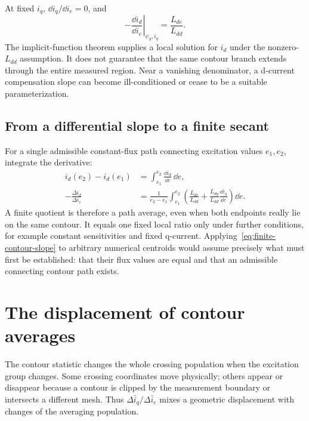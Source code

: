 At fixed $i_q$, $\dd i_q/\dd i_e=0$, and
\begin{equation}\label{eq:fixed-q-slope}
-\left.\frac{\dd i_d}{\dd i_e}\right|_{\psi_d,i_q}
=\frac{L_{de}}{L_{dd}}.
\end{equation}
The implicit-function theorem supplies a local solution for $i_d$ under the nonzero-$L_{dd}$ assumption. It does not guarantee that the same contour branch extends through the entire measured region. Near a vanishing denominator, a d-current compensation slope can become ill-conditioned or cease to be a suitable parameterization.

\subsection{From a differential slope to a finite secant}
For a single admissible constant-flux path connecting excitation values $e_1,e_2$, integrate the derivative:
\begin{align}
i_d(e_2)-i_d(e_1)
&=\int_{e_1}^{e_2}\frac{\dd i_d}{\dd e}\,\dd e,\\
-\frac{\Delta i_d}{\Delta i_e}
&=\frac{1}{e_2-e_1}\int_{e_1}^{e_2}
\left(\frac{L_{de}}{L_{dd}}
+\frac{L_{dq}}{L_{dd}}\frac{\dd i_q}{\dd e}\right)\dd e.
\label{eq:finite-contour-slope}
\end{align}
A finite quotient is therefore a path average, even when both endpoints really lie on the same contour. It equals one fixed local ratio only under further conditions, for example constant sensitivities and fixed q-current. Applying~\eqref{eq:finite-contour-slope} to arbitrary numerical centroids would assume precisely what must first be established: that their flux values are equal and that an admissible connecting contour path exists.

\section{The displacement of contour averages}
The contour statistic changes the whole crossing population when the excitation group changes. Some crossing coordinates move physically; others appear or disappear because a contour is clipped by the measurement boundary or intersects a different mesh. Thus $\Delta\bar i_q/\Delta\bar i_e$ mixes a geometric displacement with changes of the averaging population.

